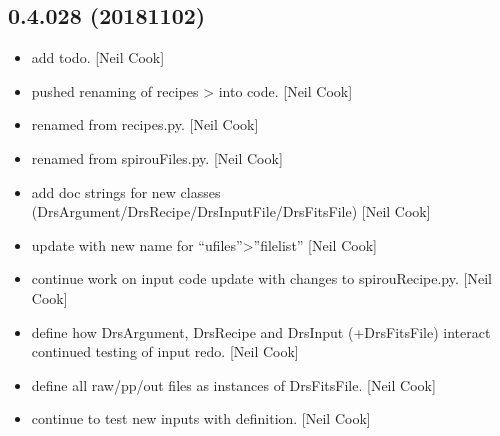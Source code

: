 \documentclass[a4paper,10pt,english]{report}
\begin{document}
\subsection{0.4.028 (2018\sphinxhyphen{}11\sphinxhyphen{}02)}
\label{\detokenize{misc/changelog:id291}}\begin{itemize}
\item {} 
 \sphinxhyphen{} add todo. {[}Neil Cook{]}

\item {} 
 \sphinxhyphen{} pushed renaming of recipes \textendash{}\textgreater{}  into
code. {[}Neil Cook{]}

\item {} 
 \sphinxhyphen{} renamed from recipes.py. {[}Neil Cook{]}

\item {} 
 \sphinxhyphen{} renamed from spirouFiles.py. {[}Neil Cook{]}

\item {} 
 \sphinxhyphen{} add doc strings for new classes
(DrsArgument/DrsRecipe/DrsInputFile/DrsFitsFile) {[}Neil Cook{]}

\item {} 
 \sphinxhyphen{} update with new name for “ufiles”\textendash{}\textgreater{}”filelist” {[}Neil
Cook{]}

\item {} 
 \sphinxhyphen{} continue work on input code \sphinxhyphen{} update with changes
to spirouRecipe.py. {[}Neil Cook{]}

\item {} 
 \sphinxhyphen{} define how DrsArgument, DrsRecipe and DrsInput
(+DrsFitsFile) interact \sphinxhyphen{} continued testing of input redo. {[}Neil Cook{]}

\item {} 
 \sphinxhyphen{} define all raw/pp/out files as instances of
DrsFitsFile. {[}Neil Cook{]}

\item {} 
 \sphinxhyphen{} continue to test new inputs with  definition.
{[}Neil Cook{]}

\end{itemize}
\end{document}
